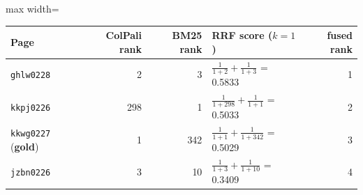 \begin{adjustbox}{max width=\linewidth}
\begin{tabular}{lrrlr}
\toprule
Page & ColPali rank & BM25 rank & RRF score ($k{=}1$) & fused rank \\
\midrule
\texttt{ghlw0228} & 2 & 3 & $\frac{1}{1+2}+\frac{1}{1+3}$ = 0.5833 & 1 \\
\texttt{kkpj0226} & 298 & 1 & $\frac{1}{1+298}+\frac{1}{1+1}$ = 0.5033 & 2 \\
\texttt{kkwg0227} (\textbf{gold}) & 1 & 342 & $\frac{1}{1+1}+\frac{1}{1+342}$ = 0.5029 & 3 \\
\texttt{jzbn0226} & 3 & 10 & $\frac{1}{1+3}+\frac{1}{1+10}$ = 0.3409 & 4 \\
\bottomrule
\end{tabular}
\end{adjustbox}
\par{}
